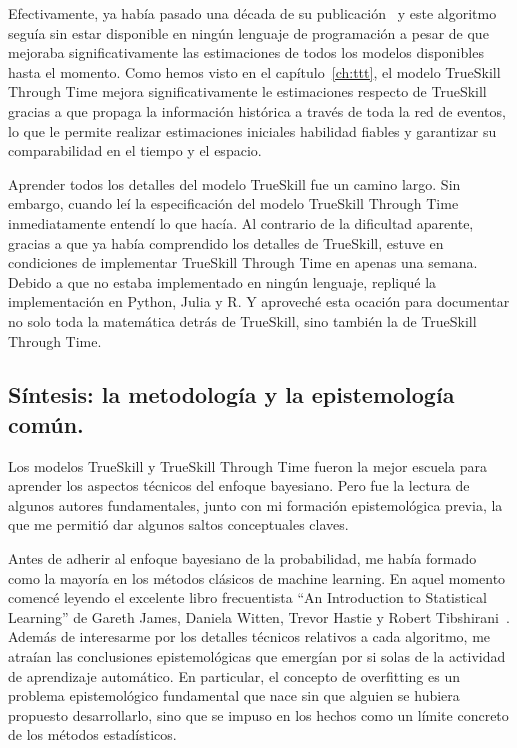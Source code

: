 \documentclass[a4paper,11pt]{book}
\theoremstyle{definition}
\begin{document}

Efectivamente, ya había pasado una década de su publicación~\cite{Dangauthier2007} y este algoritmo seguía sin estar disponible en ningún lenguaje de programación a pesar de que mejoraba significativamente las estimaciones de todos los modelos disponibles hasta el momento.
%
Como hemos visto en el capítulo~\ref{ch:ttt}, el modelo TrueSkill Through Time mejora significativamente le estimaciones respecto de TrueSkill gracias a que propaga la información histórica a través de toda la red de eventos, lo que le permite realizar estimaciones iniciales habilidad fiables y garantizar su comparabilidad en el tiempo y el espacio.


Aprender todos los detalles del modelo TrueSkill fue un camino largo.
%
Sin embargo, cuando leí la especificación del modelo TrueSkill Through Time~\cite{Dangauthier2007} inmediatamente entendí lo que hacía.
%
Al contrario de la dificultad aparente, gracias a que ya había comprendido los detalles de TrueSkill, estuve en condiciones de implementar TrueSkill Through Time en apenas una semana.
%
Debido a que no estaba implementado en ningún lenguaje, repliqué la implementación en Python, Julia y R.
%
Y aproveché esta ocación para documentar no solo toda la matemática detrás de TrueSkill, sino también la de TrueSkill Through Time.

\subsection{Síntesis: la metodología y la epistemología común.}

Los modelos TrueSkill y TrueSkill Through Time fueron la mejor escuela para aprender los aspectos técnicos del enfoque bayesiano.
%
Pero fue la lectura de algunos autores fundamentales, junto con mi formación epistemológica previa, la que me permitió dar algunos saltos conceptuales claves.


Antes de adherir al enfoque bayesiano de la probabilidad, me había formado como la mayoría en los métodos clásicos de machine learning.
%
En aquel momento comencé leyendo el excelente libro frecuentista ``An Introduction to Statistical Learning'' de Gareth James, Daniela Witten, Trevor Hastie y Robert Tibshirani~\cite{james2013-introductionToStatisticalLearning}.
%
Además de interesarme por los detalles técnicos relativos a cada algoritmo, me atraían las conclusiones epistemológicas que emergían por si solas de la actividad de aprendizaje automático.
%
En particular, el concepto de overfitting es un problema epistemológico fundamental que nace sin que alguien se hubiera propuesto desarrollarlo, sino que se impuso en los hechos como un límite concreto de los métodos estadísticos.
\end{document}
